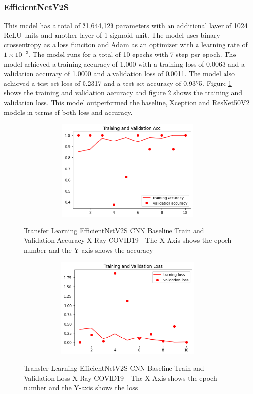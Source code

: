 \subsubsection{EfficientNetV2S}
This model has a total of 21,644,129 parameters with an additional layer of 1024 ReLU units and another layer of 1 sigmoid unit.  The model uses binary crossentropy as a loss funciton and Adam as an optimizer with a learning rate of $1\times10^{-3}$.  The model runs for a total of 10 epochs with 7 step per epoch. The model achieved a training accuracy of 1.000 with a training loss of 0.0063 and a validation accuracy of 1.0000 and a validation loss of 0.0011.  The model also achieved a test set loss of 0.2317 and a test set accuracy of 0.9375. Figure \ref{fig:EfficientNetV2S CNN Baseline Train and Validation Accuracy X-Ray COVID19} shows the training and validation accuracy and figure \ref{fig:EfficientNetV2S CNN Baseline Train and Validation Loss X-Ray COVID19} shows the training and validation loss. This model outperformed the baseline, Xception and ResNet50V2 models in terms of both loss and accuracy.
 \begin{figure}[H]
    \centering
    \includegraphics[width=1\textwidth,height=5cm,keepaspectratio]{Images/EfficientNetV2SBaselineTrainingValidationAccuracyXRayCOVID19.png}\\
    \caption{Transfer Learning EfficientNetV2S CNN Baseline Train and Validation Accuracy X-Ray COVID19 - The X-Axis shows the epoch number and the Y-axis shows the accuracy}
    \label{fig:EfficientNetV2S CNN Baseline Train and Validation Accuracy X-Ray COVID19}
\end{figure}
 \begin{figure}[H]
    \centering
    \includegraphics[width=1\textwidth,height=5cm,keepaspectratio]{Images/EfficientNetV2SBaselineTrainingValidationLossXRayCOVID19.png}\\
    \caption{Transfer Learning EfficientNetV2S CNN Baseline Train and Validation Loss X-Ray COVID19 - The X-Axis shows the epoch number and the Y-axis shows the loss}
    \label{fig:EfficientNetV2S CNN Baseline Train and Validation Loss X-Ray COVID19}
\end{figure}
